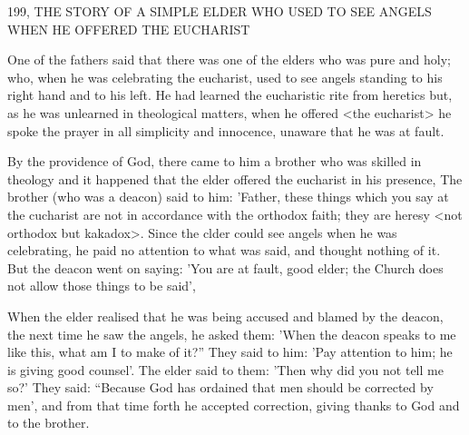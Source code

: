 199, THE STORY OF A SIMPLE ELDER
WHO USED TO SEE ANGELS WHEN HE OFFERED
THE EUCHARIST

One of the fathers said that there was one of the elders who was
pure and holy; who, when he was celebrating the eucharist, used to
see angels standing to his right hand and to his left.
He had learned
the eucharistic rite from heretics but, as he was unlearned in
theological matters, when he offered <the eucharist> he spoke the
prayer in all simplicity and innocence, unaware that he was at fault.

By the providence of God, there came to him a brother who
was skilled in theology and it happened that the elder offered the
eucharist in his presence, The brother (who was a deacon) said to
him: 'Father, these things which you say at the cucharist are not in
accordance with the orthodox faith; they are heresy <not orthodox
but kakadox>.
Since the clder could see angels when he was
celebrating, he paid no attention to what was said, and thought
nothing of it.
But the deacon went on saying: 'You are at fault,
good elder; the Church does not allow those things to be said',

When the elder realised that he was being accused and blamed by
the deacon, the next time he saw the angels, he asked them: 'When
the deacon speaks to me like this, what am I to make of it?” They
said to him: 'Pay attention to him; he is giving good counsel'.
The
elder said to them: 'Then why did you not tell me so?' They said:
“Because God has ordained that men should be corrected by men',
and from that time forth he accepted correction, giving thanks to
God and to the brother.

